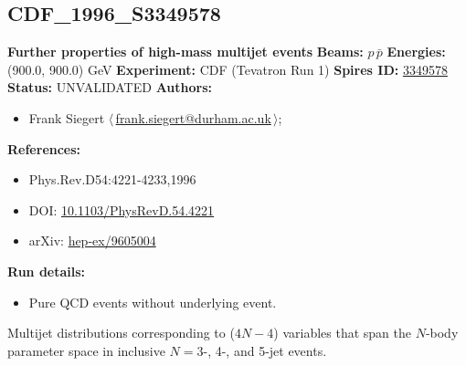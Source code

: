 \subsection[CDF\_1996\_S3349578]{CDF\_1996\_S3349578\,\cite{Abe:1996nn}}
\textbf{Further properties of high-mass multijet events}\newline
\textbf{Beams:} $p$\,$\bar{p}$ \newline
\textbf{Energies:} (900.0, 900.0) GeV \newline
\textbf{Experiment:} CDF (Tevatron Run 1) \newline
\textbf{Spires ID:} \href{http://www.slac.stanford.edu/spires/find/hep/www?rawcmd=key+3349578}{3349578}\newline
\textbf{Status:} UNVALIDATED\newline
\textbf{Authors:}
\begin{itemize}
  \item Frank Siegert $\langle\,$\href{mailto:frank.siegert@durham.ac.uk}{frank.siegert@durham.ac.uk}$\,\rangle$;
\end{itemize}
\textbf{References:}
\begin{itemize}
  \item Phys.Rev.D54:4221-4233,1996
  \item DOI: \href{http://dx.doi.org/10.1103/PhysRevD.54.4221}{10.1103/PhysRevD.54.4221}
  \item arXiv: \href{http://arxiv.org/abs/hep-ex/9605004}{hep-ex/9605004}
\end{itemize}
\textbf{Run details:}
\begin{itemize}

  \item Pure QCD events without underlying event.\end{itemize}

\noindent Multijet distributions corresponding to ($4N-4$) variables that span the $N$-body parameter space in inclusive $N = 3$-, 4-, and 5-jet events.

\clearpage


\clearpage

